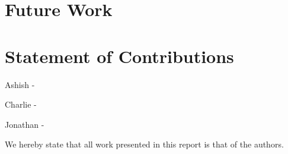 \documentclass[conference]{IEEEtran}
\begin{document}
\section{Future Work}



%


\appendices
\section{Statement of Contributions}
Ashish - \par
Charlie - \par
Jonathan - \par

We hereby state that all work presented in this report is that of the authors.


%
%
%
\end{document}
